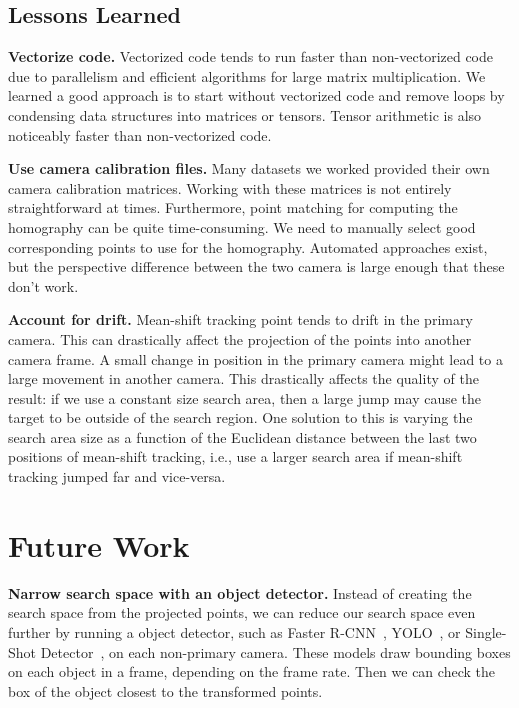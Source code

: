 \documentclass{article}
\begin{document}
\subsection{Lessons Learned}
\vspace{5pt}
\noindent\textbf{Vectorize code.} Vectorized code tends to run faster than non-vectorized code due to parallelism and efficient algorithms for large matrix multiplication. We learned a good approach is to start without vectorized code and remove loops by condensing data structures into matrices or tensors. Tensor arithmetic is also noticeably faster than non-vectorized code.

\vspace{5pt}
\noindent\textbf{Use camera calibration files.} Many datasets we worked provided their own camera calibration matrices. Working with these matrices is not entirely straightforward at times. Furthermore, point matching for computing the homography can be quite time-consuming. We need to manually select good corresponding points to use for the homography. Automated approaches exist, but the perspective difference between the two camera is large enough that these don't work.

\vspace{5pt}
\noindent\textbf{Account for drift.} Mean-shift tracking point tends to drift in the primary camera. This can drastically affect the projection of the points into another camera frame. A small change in position in the primary camera might lead to a large movement in another camera. This drastically affects the quality of the result: if we use a constant size search area, then a large jump may cause the target to be outside of the search region. One solution to this is varying the search area size as a function of the Euclidean distance between the last two positions of mean-shift tracking, i.e., use a larger search area if mean-shift tracking jumped far and vice-versa.

\section{Future Work}
\label{sec:future}
\vspace{5pt}
\noindent\textbf{Narrow search space with an object detector.} Instead of creating the search space from the projected points, we can reduce our search space even further by running a object detector, such as Faster R-CNN~\cite{ren2015faster}, YOLO~\cite{redmon2016you}, or Single-Shot Detector~\cite{liu2016ssd}, on each non-primary camera. These models draw bounding boxes on each object in a frame, depending on the frame rate. Then we can check the box of the object closest to the transformed points.
\end{document}
